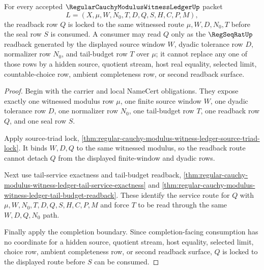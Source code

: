 \begin{theorem}
\label{thm:regular-cauchy-modulus-witness-ledger-readback-route-lock}
For every accepted $\RegularCauchyModulusWitnessLedgerUp$ packet
$$
L=(X,\mu,W,N_0,T,D,Q,S,H,C,P,M),
$$
the readback row $Q$ is locked to the same witnessed route $\mu,W,D,N_0,T$ before the seal row $S$ is consumed. A consumer may read $Q$ only as the $\RegSeqRatUp$ readback generated by the displayed source window $W$, dyadic tolerance row $D$, normalizer row $N_0$, and tail-budget row $T$ over $\mu$; it cannot replace any one of those rows by a hidden source, quotient stream, host real equality, selected limit, countable-choice row, ambient completeness row, or second readback surface.
\end{theorem}
\begin{proof}
Begin with the carrier and local NameCert obligations. They expose exactly one witnessed modulus row $\mu$, one finite source window $W$, one dyadic tolerance row $D$, one normalizer row $N_0$, one tail-budget row $T$, one readback row $Q$, and one seal row $S$.

Apply source-triad lock, \autoref{thm:regular-cauchy-modulus-witness-ledger-source-triad-lock}. It binds $W,D,Q$ to the same witnessed modulus, so the readback route cannot detach $Q$ from the displayed finite-window and dyadic rows.

Next use tail-service exactness and tail-budget readback, \autoref{thm:regular-cauchy-modulus-witness-ledger-tail-service-exactness} and \autoref{thm:regular-cauchy-modulus-witness-ledger-tail-budget-readback}. These identify the service route for $Q$ with $\mu,W,N_0,T,D,Q,S,H,C,P,M$ and force $T$ to be read through the same $W,D,Q,N_0$ path.

Finally apply the completion boundary. Since completion-facing consumption has no coordinate for a hidden source, quotient stream, host equality, selected limit, choice row, ambient completeness row, or second readback surface, $Q$ is locked to the displayed route before $S$ can be consumed.
\end{proof}


